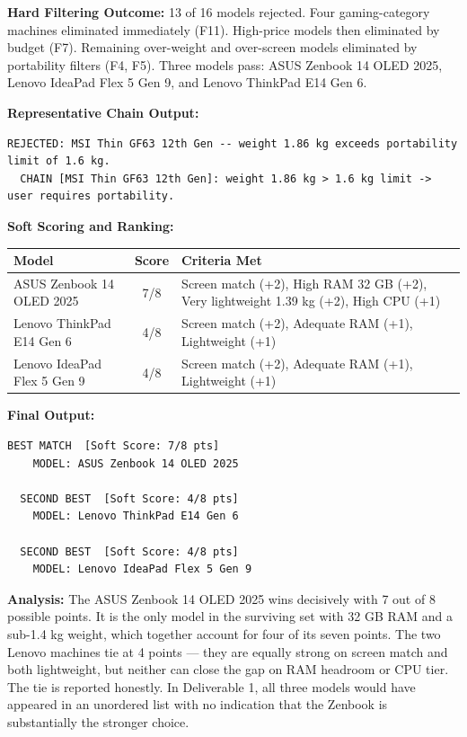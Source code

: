 \documentclass[12pt,a4paper]{article}
\begin{document}
\textbf{Hard Filtering Outcome:} 13 of 16 models rejected. Four gaming-category machines eliminated immediately (F11). High-price models then eliminated by budget (F7). Remaining over-weight and over-screen models eliminated by portability filters (F4, F5). Three models pass: ASUS Zenbook 14 OLED 2025, Lenovo IdeaPad Flex 5 Gen 9, and Lenovo ThinkPad E14 Gen 6.

\textbf{Representative Chain Output:}
\begin{lstlisting}[style=output]
REJECTED: MSI Thin GF63 12th Gen -- weight 1.86 kg exceeds portability limit of 1.6 kg.
  CHAIN [MSI Thin GF63 12th Gen]: weight 1.86 kg > 1.6 kg limit -> user requires portability.
\end{lstlisting}

\textbf{Soft Scoring and Ranking:}

\begin{center}
\renewcommand{\arraystretch}{1.4}
\begin{tabular}{lcp{6cm}}
\toprule
\textbf{Model} & \textbf{Score} & \textbf{Criteria Met} \\
\midrule
ASUS Zenbook 14 OLED 2025   & 7/8 & Screen match (+2), High RAM 32 GB (+2), Very lightweight 1.39 kg (+2), High CPU (+1) \\
Lenovo ThinkPad E14 Gen 6   & 4/8 & Screen match (+2), Adequate RAM (+1), Lightweight (+1) \\
Lenovo IdeaPad Flex 5 Gen 9 & 4/8 & Screen match (+2), Adequate RAM (+1), Lightweight (+1) \\
\bottomrule
\end{tabular}
\end{center}

\textbf{Final Output:}
\begin{lstlisting}[style=output]
  BEST MATCH  [Soft Score: 7/8 pts]
    MODEL: ASUS Zenbook 14 OLED 2025

  SECOND BEST  [Soft Score: 4/8 pts]
    MODEL: Lenovo ThinkPad E14 Gen 6

  SECOND BEST  [Soft Score: 4/8 pts]
    MODEL: Lenovo IdeaPad Flex 5 Gen 9
\end{lstlisting}

\textbf{Analysis:} The ASUS Zenbook 14 OLED 2025 wins decisively with 7 out of 8 possible points. It is the only model in the surviving set with 32 GB RAM and a sub-1.4 kg weight, which together account for four of its seven points. The two Lenovo machines tie at 4 points --- they are equally strong on screen match and both lightweight, but neither can close the gap on RAM headroom or CPU tier. The tie is reported honestly. In Deliverable 1, all three models would have appeared in an unordered list with no indication that the Zenbook is substantially the stronger choice.
\end{document}
